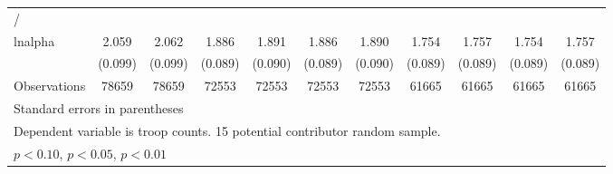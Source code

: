 \begin{table}[htbp]
\begin{tabular}{l*{10}{c}}
\hline
/                   &                    &                    &                    &                    &                    &                    &                    &                    &                    &                    \\
lnalpha             &       2.059\sym{**}&       2.062\sym{**}&       1.886\sym{**}&       1.891\sym{**}&       1.886\sym{**}&       1.890\sym{**}&       1.754\sym{**}&       1.757\sym{**}&       1.754\sym{**}&       1.757\sym{**}\\
                    &     (0.099)        &     (0.099)        &     (0.089)        &     (0.090)        &     (0.089)        &     (0.090)        &     (0.089)        &     (0.089)        &     (0.089)        &     (0.089)        \\
\hline
Observations        &       78659        &       78659        &       72553        &       72553        &       72553        &       72553        &       61665        &       61665        &       61665        &       61665        \\
\hline\hline
\multicolumn{11}{l}{\footnotesize Standard errors in parentheses}\\
\multicolumn{11}{l}{\footnotesize Dependent variable is troop counts. 15 potential contributor random sample.}\\
\multicolumn{11}{l}{\footnotesize \sym{+} \(p<0.10\), \sym{*} \(p<0.05\), \sym{**} \(p<0.01\)}\\
\end{tabular}
\end{table}
